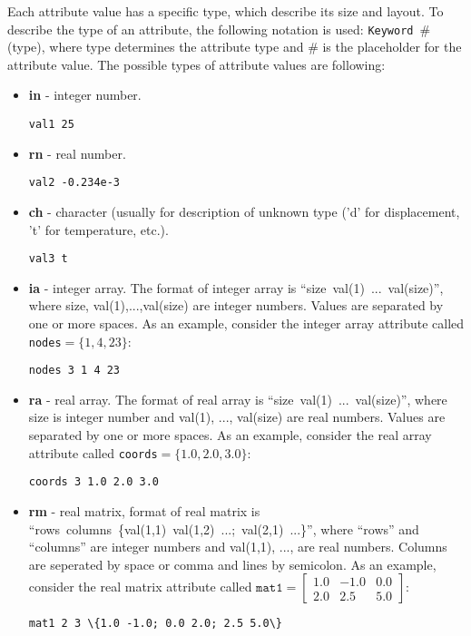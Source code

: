 \documentclass[a4paper]{report}
\newcommand{\param}[1]{\texttt{#1}} %
\newcommand{\field}[2]{\param{#1}~\#{\tiny(#2)}} %
\begin{document}
Each attribute value has a specific type, which describe its size and layout. To describe the type of an attribute, the following notation is used: 
\field{Keyword}{type}, where type determines the attribute type and \# is the placeholder for the attribute value.
The possible types of attribute values are following:
\begin{itemize}
\item \textbf{in} - integer number.
\begin{lstlisting}[style=oofem, language=oofeminput, moreemph={val1}]
val1 25
\end{lstlisting}

\item \textbf{rn} - real number.
\begin{lstlisting}[style=oofem, language=oofeminput, moreemph={val2}]
val2 -0.234e-3
\end{lstlisting}
\item \textbf{ch} - character (usually for description of unknown type ('d' for
displacement, 't' for temperature, etc.).
\begin{lstlisting}[style=oofem, language=oofeminput, moreemph={val3}]
val3 t
\end{lstlisting}

\item \textbf{ia} - integer array. The format of integer array is
``size~val(1)~...~val(size)'', where size, val(1),...,val(size) are
integer numbers. Values are separated by one or more spaces. As an example, consider the integer array attribute called \param{nodes}$=\{1,4,23\}$:
\begin{lstlisting}[style=oofem, language=oofeminput, moreemph={nodes}]
nodes 3 1 4 23
\end{lstlisting}
\item \textbf{ra} - real array. The format of real array is
``size~val(1)~...~val(size)'', where size is integer number and val(1),
..., val(size) are real numbers. Values are separated by one or more spaces. As an example, consider the real array attribute called \param{coords}$=\{1.0,2.0,3.0\}$:
\begin{lstlisting}[style=oofem, language=oofeminput, moreemph={coords}]
coords 3 1.0 2.0 3.0
\end{lstlisting}
\item \textbf{rm} - real matrix, format of real matrix is\\
``rows~columns~\{val(1,1)~val(1,2)~...;~val(2,1)~...\}'', where ``rows'' and ``columns'' are integer numbers and val(1,1),
..., are real numbers. Columns are seperated by space or comma and lines by semicolon.
As an example, consider the real matrix attribute called $\param{mat1}=\left[\begin{array}{ccc}1.0&-1.0&0.0\\2.0&2.5&5.0\end{array}\right]$:
\begin{lstlisting}[style=oofem, language=oofeminput, moreemph={mat1}]
mat1 2 3 \{1.0 -1.0; 0.0 2.0; 2.5 5.0\}
\end{lstlisting}


\end{itemize}
\end{document}
